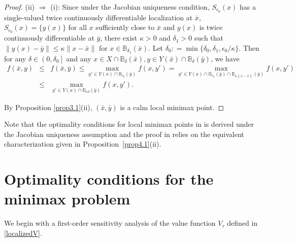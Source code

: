 \documentclass[11pt]{article}
\numberwithin{equation}{section}
\begin{document}
{\begin{proof}
(ii) $\Rightarrow$ (i): Since under the Jacobian uniqueness condition, $S_{\epsilon_0}(x)$ has a single-valued twice continuously differentiable localization at $\bar x$,  $S_{\epsilon_0}(x)=\{y(x)\}$ for all $x$ sufficiently close to $\bar x$ and $y(x)$ is twice continuously differentiable at $\bar y$, there exist $\kappa >0$ and $\delta_1>0$ such that $\|y(x)-\bar y\|\leq \kappa \|x-\bar x\|$ for $x \in \mathbb{B}_{\delta_1}(\bar x)$. Let $\delta_0: =\min \{\delta_0,\delta_1,\epsilon_0/\kappa\}$. Then for any $\delta \in\left(0, \delta_0\right]$ and any $x\in X\cap \mathbb{B}_\delta(\bar x), y\in Y(\bar x)\cap \mathbb{B}_\delta(\bar y)$, we have
\begin{eqnarray*}
f(\bar{x}, y) & \leq  &  f(\bar{x}, \bar{y}) 
 \leq  \max_{y' \in  Y(x)\cap\mathbb{B}_{\epsilon_0}(\bar y)} f (x, y' ) = \max_{y' \in  Y(x)\cap\mathbb{B}_{\epsilon_0}(\bar y)\cap\mathbb{B}_{\kappa\|x-\bar x\|}(\bar y)} f (x, y' ) \\
 & \leq &\max_{y' \in  Y(x)\cap\mathbb{B}_{\kappa\delta}(\bar y)} f (x, y' ).
\end{eqnarray*}

By Proposition \ref{prop3.1}(ii), $(\bar x,\bar y)$ is a calm local minimax point.
 
\end{proof}

Note that the optimality conditions for local minimax points in \cite{DaiZh-2020} is  derived under the Jacobian uniqueness assumption and  the proof in \cite{DaiZh-2020} relies on the equivalent characterization given in Proposition~\ref{prop4.1}(ii).


\section{Optimality conditions for the minimax problem}\label{nonsmooth-section}


We begin with a first-order sensitivity analysis of the value function \( V_{\tau} \) defined in \eqref{localizedV}.


}
\end{document}
